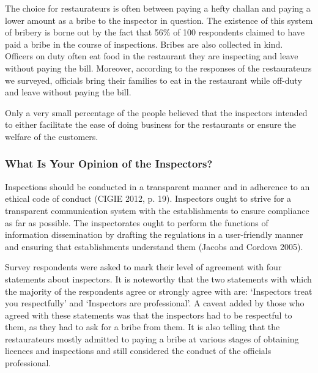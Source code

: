 \documentclass[a4paper, 12pt]{article}
\begin{document}
		The choice for restaurateurs is often between paying a hefty challan and paying a lower amount as a bribe to the inspector in question. The existence of this system of bribery is borne out by the fact that 56\% of 100 respondents claimed to have paid a 
bribe in the course of inspections. Bribes are also collected in kind. Officers on duty often eat food in the restaurant they are inspecting and leave without paying the bill. Moreover, according to the responses of the restaurateurs we surveyed, officials bring their 
families to eat in the restaurant while off-duty and leave without paying the bill.
		
		Only a very small percentage of the people believed that the inspectors intended to either facilitate the ease of doing business for the restaurants or ensure the welfare of the customers.


		\subsubsection {What Is Your Opinion of the Inspectors?}
		
		Inspections should be conducted in a transparent manner and in adherence to an ethical code of conduct (CIGIE 2012, p. 19). Inspectors ought to strive for a transparent communication system with the establishments to ensure compliance as far as 
possible. The inspectorates ought to perform the functions of information dissemination by drafting the regulations in a user-friendly manner and ensuring that establishments understand them (Jacobs and Cordova 2005).
		
		Survey respondents were asked to mark their level of agreement with four statements about inspectors. It is noteworthy that the two statements with which the majority of the respondents agree or strongly agree with are: ‘Inspectors treat you respectfully’ 
and ‘Inspectors are professional’. A caveat added by those who agreed with these statements was that the inspectors had to be respectful to them, as they had to ask for a bribe from them. It is also telling that the restaurateurs mostly admitted to paying a bribe at 
various stages of obtaining licences and inspections and still considered the conduct of the officials professional.
		
\end{document}

